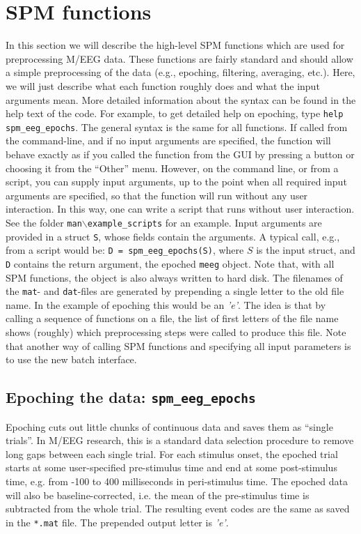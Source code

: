 \section{SPM functions}
In this section we will describe the high-level SPM functions which are used for preprocessing M/EEG data. These functions are fairly standard and should allow a simple preprocessing of the data (e.g., epoching, filtering, averaging, etc.). Here, we will just describe what each function roughly does and what the input arguments mean. More detailed information about the syntax can be found in the help text of the code. For example, to get detailed help on epoching, type \texttt{help spm\_eeg\_epochs}. The general syntax is the same for all functions. If called from the command-line, and if no input arguments are specified, the function will behave exactly as if you called the function from the GUI by pressing a button or choosing it from the ``Other'' menu. However, on the command line, or from a script, you can supply input arguments, up to the point when all required input arguments are specified, so that the function will run without any user interaction. In this way, one can write a script that runs without user interaction. See the folder \texttt{man$\backslash$example\_scripts} for an example. Input arguments are provided in a struct \texttt{S}, whose fields contain the arguments. A typical call, e.g., from a script would be: \texttt{D = spm\_eeg\_epochs(S)}, where $S$ is the input struct, and \texttt{D} contains the return argument, the epoched \texttt{meeg} object. Note that, with all SPM functions, the object is also always written to hard disk. The filenames of the \texttt{mat}- and \texttt{dat}-files are generated by prepending a single letter to the old file name. In the example of epoching this would be an \textit{'e'}. The idea is that by calling a sequence of functions on a file, the list of first letters of the file name shows (roughly) which preprocessing steps were called to produce this file. Note that another way of calling SPM functions and specifying all input parameters is to use the new batch interface.

\subsection{Epoching the data: \texttt{spm\_eeg\_epochs}}
Epoching cuts out little chunks of continuous data and saves them as ``single trials''. In M/EEG research, this is a standard data selection procedure to remove long gaps between each single trial. For each stimulus onset, the epoched trial starts at some user-specified pre-stimulus time and end at some post-stimulus time, e.g. from -100 to 400 milliseconds in peri-stimulus time. The epoched data will also be baseline-corrected, i.e. the mean of the pre-stimulus time is subtracted from the whole trial. The resulting event codes are the same as saved in the \texttt{*.mat} file. The prepended output letter is \textit{'e'}.

